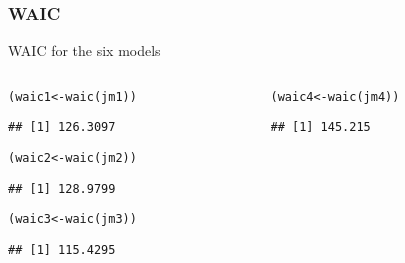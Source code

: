 \documentclass[color=usenames,dvipsnames]{beamer}\usepackage[]{graphicx}\usepackage[]{color}
\makeatletter
\newcommand{\hlstd}[1]{\textcolor[rgb]{0,0,0}{#1}}%
\newcommand{\hlkwb}[1]{\textcolor[rgb]{0,0.341,0.682}{#1}}%
\newcommand{\hlkwd}[1]{\textcolor[rgb]{0.004,0.004,0.506}{#1}}%
\newenvironment{kframe}{%
 \def\at@end@of@kframe{}%
 \ifinner\ifhmode%
  \def\at@end@of@kframe{\end{minipage}}%
  \begin{minipage}{\columnwidth}%
 \fi\fi%
 \def\FrameCommand##1{\hskip\@totalleftmargin \hskip-\fboxsep
 \colorbox{shadecolor}{##1}\hskip-\fboxsep
     \hskip-\linewidth \hskip-\@totalleftmargin \hskip\columnwidth}%
 \MakeFramed {\advance\hsize-\width
   \@totalleftmargin\z@ \linewidth\hsize
   \@setminipage}}%
 {\par\unskip\endMakeFramed%
 \at@end@of@kframe}
\newenvironment{knitrout}{}{} %
\makeatother
\begin{document}
\begin{frame}[fragile]
  \frametitle{WAIC}
  WAIC for the six models
  \begin{columns}
    \begin{column}{0.5\textwidth}
\begin{knitrout}\scriptsize
{}\color{fgcolor}\begin{kframe}
\begin{alltt}
\hlstd{(waic1} \hlkwb{<-} \hlkwd{waic}\hlstd{(jm1))}
\end{alltt}
\begin{verbatim}
## [1] 126.3097
\end{verbatim}
\end{kframe}
\end{knitrout}
\begin{knitrout}\scriptsize
{}\color{fgcolor}\begin{kframe}
\begin{alltt}
\hlstd{(waic2} \hlkwb{<-} \hlkwd{waic}\hlstd{(jm2))}
\end{alltt}
\begin{verbatim}
## [1] 128.9799
\end{verbatim}
\end{kframe}
\end{knitrout}
\begin{knitrout}\scriptsize
{}\color{fgcolor}\begin{kframe}
\begin{alltt}
\hlstd{(waic3} \hlkwb{<-} \hlkwd{waic}\hlstd{(jm3))}
\end{alltt}
\begin{verbatim}
## [1] 115.4295
\end{verbatim}
\end{kframe}
\end{knitrout}
    \end{column}
    \begin{column}{0.5\textwidth}
\begin{knitrout}\scriptsize
{}\color{fgcolor}\begin{kframe}
\begin{alltt}
\hlstd{(waic4} \hlkwb{<-} \hlkwd{waic}\hlstd{(jm4))}
\end{alltt}
\begin{verbatim}
## [1] 145.215
\end{verbatim}
\end{kframe}

\end{knitrout}
\end{column}
\end{columns}
\end{frame}
\end{document}

